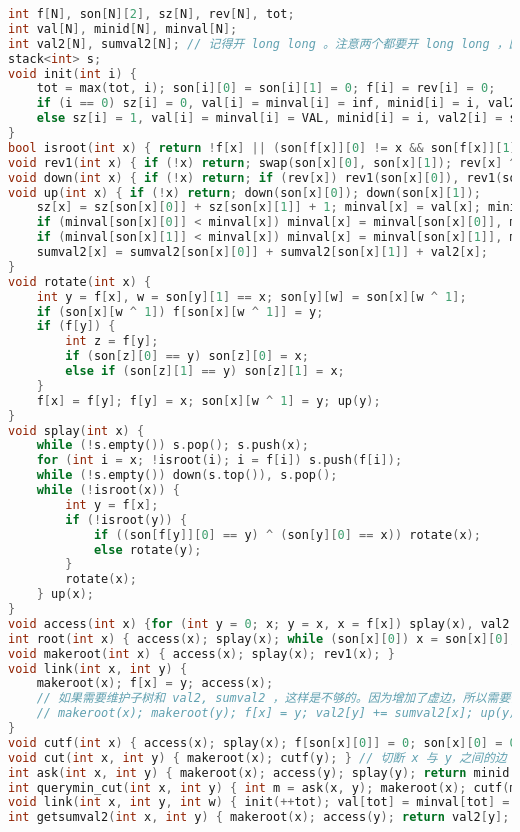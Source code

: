 \documentclass[landscape,a4paper]{article}
\begin{document}
\begin{lstlisting}[language=C++]
int f[N], son[N][2], sz[N], rev[N], tot;
int val[N], minid[N], minval[N];
int val2[N], sumval2[N]; // 记得开 long long 。注意两个都要开 long long ，因为 val2 还包含了虚儿子的子树和。
stack<int> s;
void init(int i) {
	tot = max(tot, i); son[i][0] = son[i][1] = 0; f[i] = rev[i] = 0;
	if (i == 0) sz[i] = 0, val[i] = minval[i] = inf, minid[i] = i, val2[i] = sumval2[i] = 0;
	else sz[i] = 1, val[i] = minval[i] = VAL, minid[i] = i, val2[i] = sumval2[i] = VAL2;
}
bool isroot(int x) { return !f[x] || (son[f[x]][0] != x && son[f[x]][1] != x); }
void rev1(int x) { if (!x) return; swap(son[x][0], son[x][1]); rev[x] ^= 1; }
void down(int x) { if (!x) return; if (rev[x]) rev1(son[x][0]), rev1(son[x][1]), rev[x] = 0; }
void up(int x) { if (!x) return; down(son[x][0]); down(son[x][1]);
	sz[x] = sz[son[x][0]] + sz[son[x][1]] + 1; minval[x] = val[x]; minid[x] = x;
	if (minval[son[x][0]] < minval[x]) minval[x] = minval[son[x][0]], minid[x] = minid[son[x][0]];
	if (minval[son[x][1]] < minval[x]) minval[x] = minval[son[x][1]], minid[x] = minid[son[x][1]];
	sumval2[x] = sumval2[son[x][0]] + sumval2[son[x][1]] + val2[x];
}
void rotate(int x) {
	int y = f[x], w = son[y][1] == x; son[y][w] = son[x][w ^ 1];
	if (son[x][w ^ 1]) f[son[x][w ^ 1]] = y;
	if (f[y]) {
		int z = f[y];
		if (son[z][0] == y) son[z][0] = x;
		else if (son[z][1] == y) son[z][1] = x;
	}
	f[x] = f[y]; f[y] = x; son[x][w ^ 1] = y; up(y);
}
void splay(int x) {
	while (!s.empty()) s.pop(); s.push(x);
	for (int i = x; !isroot(i); i = f[i]) s.push(f[i]);
	while (!s.empty()) down(s.top()), s.pop();
	while (!isroot(x)) {
		int y = f[x];
		if (!isroot(y)) {
			if ((son[f[y]][0] == y) ^ (son[y][0] == x)) rotate(x);
			else rotate(y);
		}
		rotate(x);
	} up(x);
}
void access(int x) {for (int y = 0; x; y = x, x = f[x]) splay(x), val2[x] += sumval2[son[x][1]], son[x][1] = y, val2[x] -= sumval2[son[x][1]], up(x); }
int root(int x) { access(x); splay(x); while (son[x][0]) x = son[x][0]; return x; }
void makeroot(int x) { access(x); splay(x); rev1(x); }
void link(int x, int y) {
	makeroot(x); f[x] = y; access(x);
	// 如果需要维护子树和 val2, sumval2 ，这样是不够的。因为增加了虚边，所以需要修改 val2 值。将上面的代码替换为以下代码：
	// makeroot(x); makeroot(y); f[x] = y; val2[y] += sumval2[x]; up(y); access(x);
}
void cutf(int x) { access(x); splay(x); f[son[x][0]] = 0; son[x][0] = 0; up(x); } // 它和父亲的边
void cut(int x, int y) { makeroot(x); cutf(y); } // 切断 x 与 y 之间的边（须保证 x 与 y 相邻）
int ask(int x, int y) { makeroot(x); access(y); splay(y); return minid[y]; } // 询问 x 到 y 之间取得最小值的点
int querymin_cut(int x, int y) { int m = ask(x, y); makeroot(x); cutf(m); makeroot(y); cutf(m); return val[m]; } // 询问 x 到 y 之间取得最小值的点，并把它删去（须保证该点在 x 和 y 之间，且度数恰好为 2）
void link(int x, int y, int w) { init(++tot); val[tot] = minval[tot] = w; link(x, tot); link(y, tot); } // 在 x 和 y 之间添加一条权值为 w 的边（将边视为点插入）
int getsumval2(int x, int y) { makeroot(x); access(y); return val2[y]; } // 令 x 为根，求 y 子树的 val2 的和
\end{lstlisting}
\end{document}
